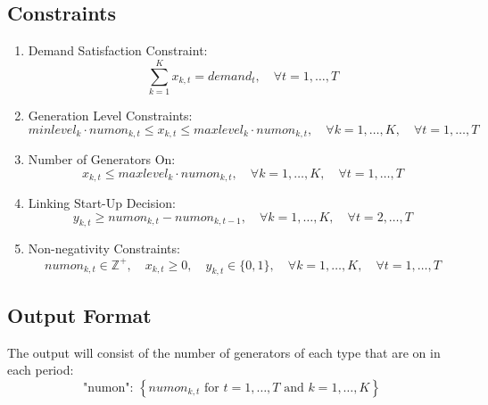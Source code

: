 \documentclass{article}
\begin{document}
\subsection*{Constraints}

\begin{enumerate}
    \item Demand Satisfaction Constraint:
    \[
    \sum_{k=1}^{K} x_{k, t} = demand_{t}, \quad \forall t = 1, \ldots, T
    \]
    
    \item Generation Level Constraints:
    \[
    minlevel_{k} \cdot numon_{k, t} \leq x_{k, t} \leq maxlevel_{k} \cdot numon_{k, t}, \quad \forall k = 1, \ldots, K, \quad \forall t = 1, \ldots, T
    \]

    \item Number of Generators On:
    \[
    x_{k, t} \leq maxlevel_{k} \cdot numon_{k, t}, \quad \forall k = 1, \ldots, K, \quad \forall t = 1, \ldots, T
    \]
    
    \item Linking Start-Up Decision:
    \[
    y_{k, t} \geq numon_{k, t} - numon_{k, t-1}, \quad \forall k = 1, \ldots, K, \quad \forall t = 2, \ldots, T
    \]
    
    \item Non-negativity Constraints:
    \[
    numon_{k, t} \in \mathbb{Z}^{+}, \quad x_{k, t} \geq 0, \quad y_{k, t} \in \{0, 1\}, \quad \forall k = 1, \ldots, K, \quad \forall t = 1, \ldots, T
    \]
\end{enumerate}

\subsection*{Output Format}
The output will consist of the number of generators of each type that are on in each period:
\[
\text{"numon": } \left\{ numon_{k, t} \text{ for } t=1,\ldots,T \text{ and } k=1,\ldots,K \right\}
\]
\end{document}
